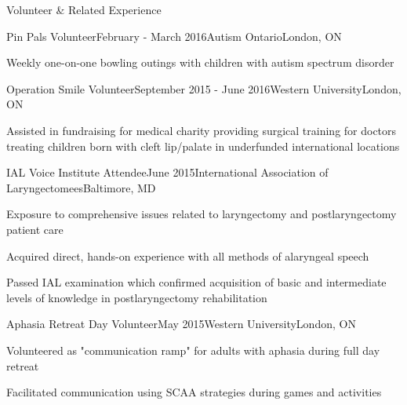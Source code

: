 \documentclass{resume} %
\begin{document}

\begin{rSection}{Volunteer \& Related Experience}


	\begin{rSubsection}{Pin Pals Volunteer}{February - March 2016}{Autism Ontario}{London, ON}
	\item Weekly one-on-one bowling outings with children with autism spectrum disorder
	
	\end{rSubsection}
	
	
	\begin{rSubsection}{Operation Smile Volunteer}{September 2015 - June 2016}{Western University}{London, ON}
	\item Assisted in fundraising for medical charity providing surgical training for doctors treating children born with cleft lip/palate in underfunded international locations
	
	\end{rSubsection}
	
	
	\begin{rSubsection}{IAL Voice Institute Attendee}{June 2015}{International Association of Laryngectomees}{Baltimore, MD}
	\item Exposure to comprehensive issues related to laryngectomy and postlaryngectomy patient care
	\item Acquired direct, hands-on experience with all methods of alaryngeal speech %
	\item Passed IAL examination which confirmed acquisition of basic and intermediate levels of knowledge in postlaryngectomy rehabilitation
	
	\end{rSubsection}
	

	
	\begin{rSubsection}{Aphasia Retreat Day Volunteer}{May 2015}{Western University}{London, ON}
	\item Volunteered as "communication ramp" for adults with aphasia during full day retreat
	\item Facilitated communication using SCAA strategies during games and activities 
	

\end{rSubsection}
\end{rSection}
\end{document}
